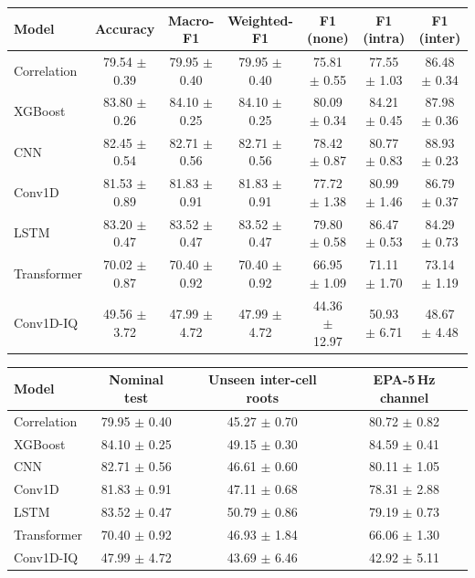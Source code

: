 \begin{tabular}{lcccccc}
\toprule
Model & Accuracy & Macro-F1 & Weighted-F1 & F1 (none) & F1 (intra) & F1 (inter) \\
\midrule
Correlation & 79.54 $\pm$ 0.39 & 79.95 $\pm$ 0.40 & 79.95 $\pm$ 0.40 & 75.81 $\pm$ 0.55 & 77.55 $\pm$ 1.03 & 86.48 $\pm$ 0.34 \\
XGBoost & 83.80 $\pm$ 0.26 & 84.10 $\pm$ 0.25 & 84.10 $\pm$ 0.25 & 80.09 $\pm$ 0.34 & 84.21 $\pm$ 0.45 & 87.98 $\pm$ 0.36 \\
CNN & 82.45 $\pm$ 0.54 & 82.71 $\pm$ 0.56 & 82.71 $\pm$ 0.56 & 78.42 $\pm$ 0.87 & 80.77 $\pm$ 0.83 & 88.93 $\pm$ 0.23 \\
Conv1D & 81.53 $\pm$ 0.89 & 81.83 $\pm$ 0.91 & 81.83 $\pm$ 0.91 & 77.72 $\pm$ 1.38 & 80.99 $\pm$ 1.46 & 86.79 $\pm$ 0.37 \\
LSTM & 83.20 $\pm$ 0.47 & 83.52 $\pm$ 0.47 & 83.52 $\pm$ 0.47 & 79.80 $\pm$ 0.58 & 86.47 $\pm$ 0.53 & 84.29 $\pm$ 0.73 \\
Transformer & 70.02 $\pm$ 0.87 & 70.40 $\pm$ 0.92 & 70.40 $\pm$ 0.92 & 66.95 $\pm$ 1.09 & 71.11 $\pm$ 1.70 & 73.14 $\pm$ 1.19 \\
Conv1D-IQ & 49.56 $\pm$ 3.72 & 47.99 $\pm$ 4.72 & 47.99 $\pm$ 4.72 & 44.36 $\pm$ 12.97 & 50.93 $\pm$ 6.71 & 48.67 $\pm$ 4.48 \\
\bottomrule
\end{tabular}

\begin{tabular}{lccc}
\toprule
Model & Nominal test & Unseen inter-cell roots & EPA-5\,Hz channel \\
\midrule
Correlation & 79.95 $\pm$ 0.40 & 45.27 $\pm$ 0.70 & 80.72 $\pm$ 0.82 \\
XGBoost & 84.10 $\pm$ 0.25 & 49.15 $\pm$ 0.30 & 84.59 $\pm$ 0.41 \\
CNN & 82.71 $\pm$ 0.56 & 46.61 $\pm$ 0.60 & 80.11 $\pm$ 1.05 \\
Conv1D & 81.83 $\pm$ 0.91 & 47.11 $\pm$ 0.68 & 78.31 $\pm$ 2.88 \\
LSTM & 83.52 $\pm$ 0.47 & 50.79 $\pm$ 0.86 & 79.19 $\pm$ 0.73 \\
Transformer & 70.40 $\pm$ 0.92 & 46.93 $\pm$ 1.84 & 66.06 $\pm$ 1.30 \\
Conv1D-IQ & 47.99 $\pm$ 4.72 & 43.69 $\pm$ 6.46 & 42.92 $\pm$ 5.11 \\
\bottomrule
\end{tabular}

